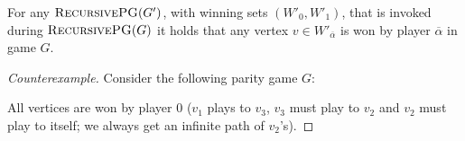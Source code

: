 \begin{conjecture}[Disproven]
	\label{con_opponent_a_always_wins}
	For any $\textsc{RecursivePG}(G')$, with winning sets $(W'_0,W'_1)$, that is invoked during $\textsc{RecursivePG}(G)$ it holds that any vertex $v \in W'_{\overline{\alpha}}$ is won by player $\overline{\alpha}$ in game $G$.
	\begin{proof}[Counterexample]
		Consider the following parity game $G$:
		\begin{center}
		\end{center}
		
		All vertices are won by player $0$ ($v_1$ plays to $v_3$, $v_3$ must play to $v_2$ and $v_2$ must play to itself; we always get an infinite path of $v_2$'s).
		

\end{proof}
\end{conjecture}
